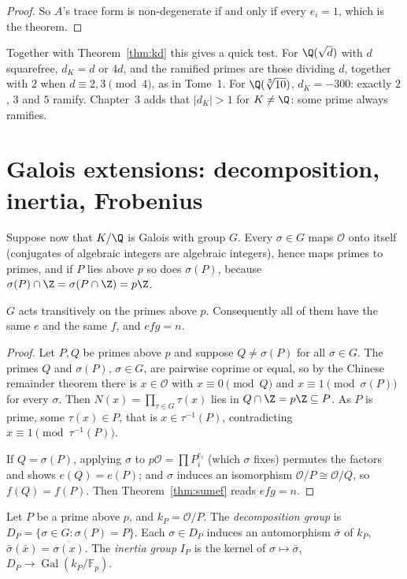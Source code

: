 \begin{proof}
So $A$'s trace form is non-degenerate if and only if every $e_i=1$, which is the theorem.
\end{proof}

Together with Theorem~\ref{thm:kd} this gives a quick test. For $\Q(\sqrt d)$ with $d$ squarefree, $d_K=d$ or $4d$, and
the ramified primes are those dividing $d$, together with $2$ when $d\equiv2,3\pmod4$, as in Tome~1. For
$\Q(\sqrt[3]{10})$, $d_K=-300$: exactly $2$, $3$ and $5$ ramify. Chapter~3 adds that $|d_K|>1$ for $K\ne\Q$: some prime
always ramifies.

\section{Galois extensions: decomposition, inertia, Frobenius}

Suppose now that $K/\Q$ is Galois with group $G$. Every $\sigma\in G$ maps $\mathcal O$ onto itself (conjugates of
algebraic integers are algebraic integers), hence maps primes to primes, and if $P$ lies above $p$ so does $\sigma(P)$,
because $\sigma(P)\cap\Z=\sigma(P\cap\Z)=p\Z$.

\begin{theorem}\label{thm:transitive}
$G$ acts transitively on the primes above $p$. Consequently all of them have the same $e$ and the same $f$, and
$efg=n$.
\end{theorem}
\begin{proof}
Let $P,Q$ be primes above $p$ and suppose $Q\ne\sigma(P)$ for all $\sigma\in G$. The primes $Q$ and $\sigma(P)$, $\sigma\in
G$, are pairwise coprime or equal, so by the Chinese remainder theorem there is $x\in\mathcal O$ with $x\equiv0\pmod Q$
and $x\equiv1\pmod{\sigma(P)}$ for every $\sigma$. Then $N(x)=\prod_{\tau\in G}\tau(x)$ lies in $Q\cap\Z=p\Z\subseteq P$.
As $P$ is prime, some $\tau(x)\in P$, that is $x\in\tau^{-1}(P)$, contradicting $x\equiv1\pmod{\tau^{-1}(P)}$.

If $Q=\sigma(P)$, applying $\sigma$ to $p\mathcal O=\prod P_i^{e_i}$ (which $\sigma$ fixes) permutes the factors and
shows $e(Q)=e(P)$; and $\sigma$ induces an isomorphism $\mathcal O/P\cong\mathcal O/Q$, so $f(Q)=f(P)$. Then
Theorem~\ref{thm:sumef} reads $efg=n$.
\end{proof}

\begin{definition}
Let $P$ be a prime above $p$, and $k_P=\mathcal O/P$. The \emph{decomposition group} is $D_P=\{\sigma\in G:\sigma(P)=P\}$.
Each $\sigma\in D_P$ induces an automorphism $\bar\sigma$ of $k_P$, $\bar\sigma(\bar x)=\overline{\sigma(x)}$. The
\emph{inertia group} $I_P$ is the kernel of $\sigma\mapsto\bar\sigma$, $D_P\to\operatorname{Gal}(k_P/\mathbb F_p)$.
\end{definition}


